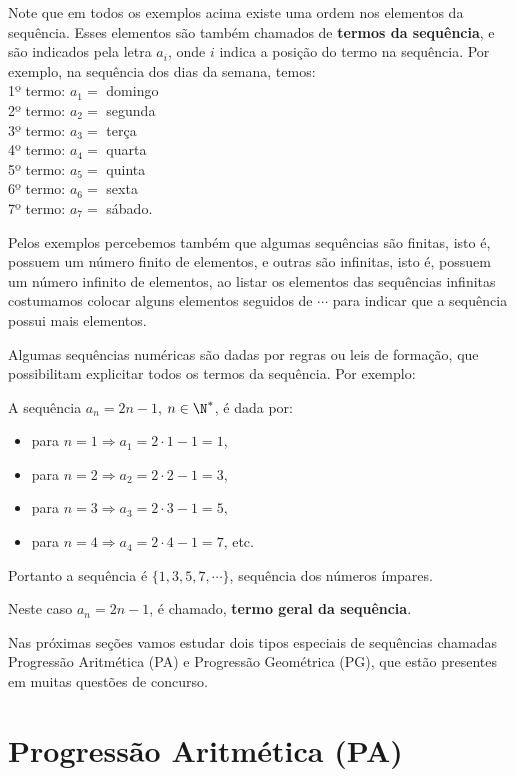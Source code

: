  Note que em todos os exemplos acima existe uma ordem nos elementos da sequência. Esses elementos são também chamados de \textbf{termos da sequência}, e são indicados pela letra $a_i$, onde $i$ indica a posição do termo na sequência. Por exemplo, na sequência dos dias da semana, temos: \\
 1º termo: $a_1=$ domingo\\
 2º termo: $a_2=$ segunda\\
 3º termo: $a_3=$ terça\\
 4º termo: $a_4=$ quarta\\
 5º termo: $a_5=$ quinta\\
 6º termo: $a_6=$ sexta \\
 7º termo: $a_7=$ sábado.
 
 Pelos exemplos percebemos também que algumas sequências são finitas, isto é, possuem um número finito de elementos, e outras são infinitas, isto é, possuem um número infinito de elementos, ao listar os elementos das sequências infinitas costumamos colocar alguns elementos seguidos de $\cdots$ para indicar que a sequência possui mais elementos.
 
 Algumas sequências numéricas são dadas por regras ou leis de formação, que possibilitam explicitar todos os termos da sequência. Por exemplo:
 \begin{exem}
  A sequência $a_n= 2n-1$, $n \in \N^{\ast}$, é dada por:
  \begin{itemize}
   \item para $n=1 \Rightarrow a_1=2\cdot 1 - 1= 1$,
   \item para $n=2 \Rightarrow a_2=2\cdot 2 - 1= 3$,
   \item para $n=3 \Rightarrow a_3=2\cdot 3 - 1= 5$,
   \item para $n=4 \Rightarrow a_4=2\cdot 4 - 1= 7$, etc.
  \end{itemize}
 Portanto a sequência é $\{1, 3, 5, 7, \cdots\}$, sequência dos números ímpares.
 
 Neste caso $a_n= 2n-1$, é chamado, \textbf{termo geral da sequência}.
 \end{exem}

 Nas próximas seções vamos estudar dois tipos especiais de sequências chamadas Progressão Aritmética (PA) e Progressão Geométrica (PG), que estão presentes em muitas questões de concurso.

\section{Progressão Aritmética (PA)}

